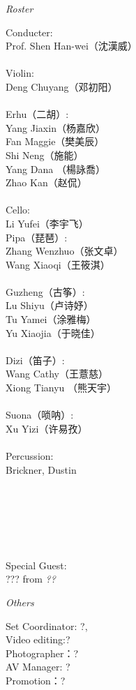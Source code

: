 \documentclass[letter,8pt,poets]{ConcProg}
\begin{document}
\begin{spacing}{1.0}
\begin{center}
\Large\textsl{ Roster}
\end{center}
\begin{multicols}{2}%
\begin{spacing}{1.5}
Conducter:\\
Prof. Shen  Han-wei（沈漢威）
\\
\\
Violin:\\
Deng  Chuyang（邓初阳）\\
\\
Erhu（二胡）:     \\   
Yang  Jiaxin（杨嘉欣）\\  
Fan  Maggie（樊美辰）\\
Shi Neng（施能）\\
Yang  Dana （楊詠喬）\\
Zhao  Kan（赵侃）\\
\\
Cello:\\
Li  Yufei（李宇飞）\\

Pipa（琵琶）:\\
Zhang  Wenzhuo（张文卓）\\
Wang Xiaoqi（王筱淇）\\
\\
Guzheng（{古筝}）:\\
Lu  Shiyu（卢诗妤）\\
Tu  Yamei（涂雅梅）\\
Yu Xiaojia（于晓佳）
\\
\\
Dizi（笛子）: 				 \\
Wang  Cathy（王薏慈）\\
Xiong  Tianyu （熊天宇）\\
\\
Suona（唢呐）:\\
Xu  Yizi（许易孜）
\\
\\
Percussion:\\
Brickner, Dustin
\\
\\
\\
\\
\\
\\
\\
Special Guest:\\
??? 
 \footnotesize{ from } \emph{ ??}
\\
\end{spacing}
\end{multicols}
\begin{center}
\Large\textsl{ Others}
\end{center}
\begin{multicols}{2}%
 Set Coordinator: ?,\\ 
 Video editing:? \\
Photographer：?\\
AV Manager: ?\\
Promotion：?\\
\\



\end{multicols}
\end{spacing}
\end{document}
